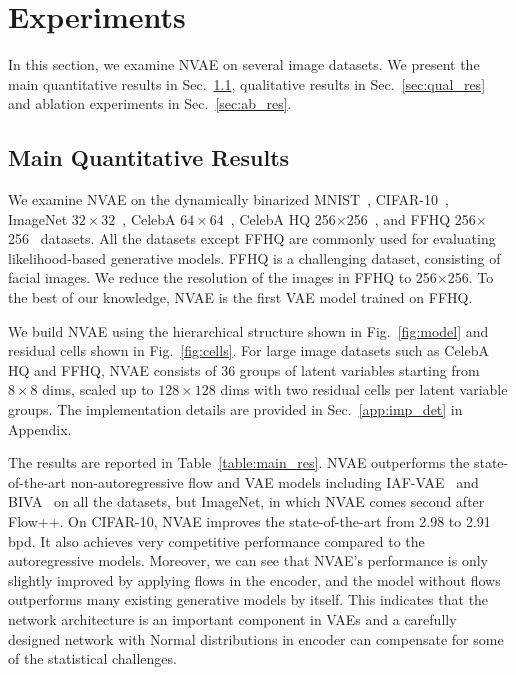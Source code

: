 \documentclass{article}
\begin{document}
\captionsetup{skip=2pt}

\section{Experiments}\label{sec:expr}

In this section, we examine NVAE on several image datasets. We present the main quantitative results in Sec.~\ref{sec:main_res}, qualitative results in Sec.~\ref{sec:qual_res} and ablation experiments in Sec.~\ref{sec:ab_res}.

\subsection{Main Quantitative Results}\label{sec:main_res}
We examine NVAE on the dynamically binarized MNIST~\cite{lecun1998mnist}, CIFAR-10~\cite{krizhevsky2009cifar}, ImageNet $32\times32$~\cite{deng2009imagenet}, CelebA $64\times64$~\cite{liu2015celeba, larsen2016autoencoding}, CelebA HQ 256$\times$256~\cite{karras2018progressive}, and FFHQ 256$\times$256~\cite{karras2019style} datasets. All the datasets except FFHQ are commonly used for evaluating likelihood-based generative models. FFHQ is a challenging dataset, consisting of facial images. We reduce the resolution of the images in FFHQ to 256$\times$256. To the best of our knowledge, NVAE is the first VAE model trained on FFHQ. 

We build NVAE using the hierarchical structure shown in Fig.~\ref{fig:model} and residual cells shown in Fig.~\ref{fig:cells}.
For large image datasets such as CelebA HQ and FFHQ, NVAE consists of 36 groups of latent variables starting from $8\times8$ dims, scaled up to $128\times128$ dims with two residual cells per latent variable groups. The implementation details are provided in Sec.~\ref{app:imp_det} in Appendix.

The results are reported in Table~\ref{table:main_res}. NVAE outperforms the state-of-the-art non-autoregressive flow and VAE models including IAF-VAE~\cite{kingma2016improved} and BIVA~\cite{maaloe2019biva} on all the datasets, but ImageNet, in which NVAE comes second after Flow++\cite{ho19flow++}. On CIFAR-10, NVAE improves the state-of-the-art from 2.98 to 2.91 bpd. It also achieves very competitive performance compared to the autoregressive models.  Moreover, we can see that NVAE's performance is only slightly improved by applying flows in the encoder, and the model without flows outperforms many existing generative models by itself. This indicates that the network architecture is an important component in VAEs and a carefully designed network with Normal distributions in encoder can compensate for some of the statistical challenges.
\end{document}
